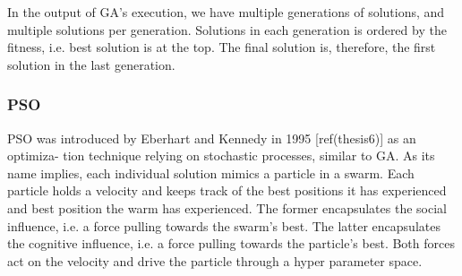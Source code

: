In the output of GA’s execution, we have multiple generations of solutions, and
multiple solutions per generation. Solutions in each generation is ordered by
the fitness, i.e. best solution is at the top. The final solution is, therefore,
the first solution in the last generation.

\subsubsection{PSO}

PSO was introduced by Eberhart and Kennedy in 1995 [ref(thesis6)] as an
optimiza- tion technique relying on stochastic processes, similar to GA. As its
name implies, each individual solution mimics a particle in a swarm. Each
particle holds a velocity and keeps track of the best positions it has
experienced and best position the warm has experienced. The former encapsulates
the social influence, i.e. a force pulling towards the swarm’s best. The latter
encapsulates the cognitive influence, i.e. a force pulling towards the
particle’s best. Both forces act on the velocity and drive the particle through
a hyper parameter space.

